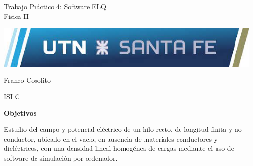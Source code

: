\documentclass[11pt, letterpaper]{article}
\newcommand\vspt{15pt}
\newcommand\vsp{10pt}
\newcommand\tpn{4}
\newcommand\tptitle{Software ELQ}
\newcommand\tpsubj{Fisica II}
\begin{document}
\thispagestyle{empty}

\begin{center}\Huge{Trabajo Práctico \tpn: \tptitle\\
\vspace{\vspt}
\tpsubj}\end{center}

\vspace{\vspt}
\includegraphics[width=\linewidth]{utnlogo}

\vspace{\vspt}
\begin{center}\Huge{Franco Cosolito}\end{center}

\vspace{\vspt}
\begin{center}\Large{ISI C}\end{center}
\pagebreak

\setcounter{page}{1}
\begin{center}\textbf{Objetivos}\end{center}
    Estudio del campo y potencial eléctrico de un hilo recto, de 
    longitud finita y no conductor, ubicado en el vacío, en 
    ausencia de materiales conductores y dieléctricos, con
    una densidad lineal homogénea de cargas mediante el uso de
    software de simulación por ordenador.\\
\vspace{\vsp}
\end{document}
